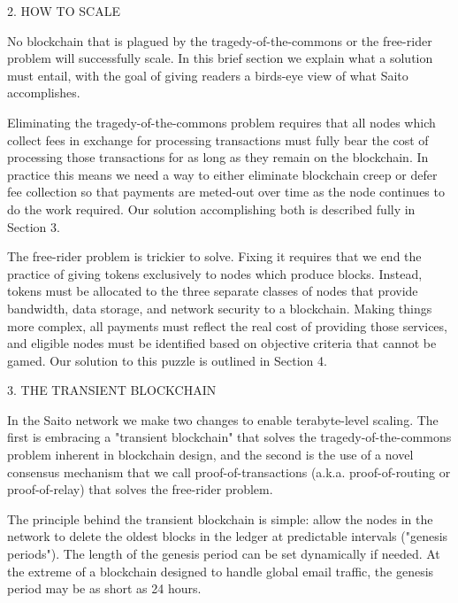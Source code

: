 \documentclass[11.5pt, oneside]{article}   	%
\begin{document}
\begin{multicols}{2}
2. HOW TO SCALE

No blockchain that is plagued by the tragedy-of-the-commons or the free-rider problem will successfully scale. In this brief section we explain what a solution must entail, with the goal of giving readers a birds-eye view of what Saito accomplishes.

Eliminating the tragedy-of-the-commons problem requires that all nodes which collect fees in exchange for processing transactions must fully bear the cost of processing those transactions for as long as they remain on the blockchain. In practice this means we need a way to either eliminate blockchain creep or defer fee collection so that payments are meted-out over time as the node continues to do the work required. Our solution accomplishing both is described fully in Section 3.

The free-rider problem is trickier to solve. Fixing it requires that we end the practice of giving tokens exclusively to nodes which produce blocks. Instead, tokens must be allocated to the three separate classes of nodes that provide bandwidth, data storage, and network security to a blockchain. Making things more complex, all payments must reflect the real cost of providing those services, and eligible nodes must be identified based on objective criteria that cannot be gamed. Our solution to this puzzle is outlined in Section 4.

3. THE TRANSIENT BLOCKCHAIN

In the Saito network we make two changes to enable terabyte-level scaling. The first is embracing a "transient blockchain" that solves the tragedy-of-the-commons problem inherent in blockchain design, and the second is the use of a novel consensus mechanism that we call proof-of-transactions (a.k.a. proof-of-routing or proof-of-relay) that solves the free-rider problem. 

The principle behind the transient blockchain is simple: allow the nodes in the network to delete the oldest blocks in the ledger at predictable intervals ("genesis periods"). The length of the genesis period can be set dynamically if needed. At the extreme of a blockchain designed to handle global email traffic, the genesis period may be as short as 24 hours.


\end{multicols}
\end{document}
